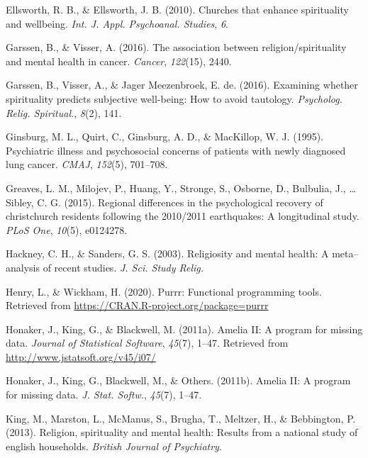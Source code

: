 \documentclass[
  english,
  man,floatsintext]{apa6}
\begin{document}
\leavevmode\hypertarget{ref-Ellsworth2010-yu}{}%
Ellsworth, R. B., \& Ellsworth, J. B. (2010). Churches that enhance spirituality and wellbeing. \emph{Int. J. Appl. Psychoanal. Studies}, \emph{6}.

\leavevmode\hypertarget{ref-Garssen2016-km}{}%
Garssen, B., \& Visser, A. (2016). The association between religion/spirituality and mental health in cancer. \emph{Cancer}, \emph{122}(15), 2440.

\leavevmode\hypertarget{ref-Garssen2016-kb}{}%
Garssen, B., Visser, A., \& Jager Meezenbroek, E. de. (2016). Examining whether spirituality predicts subjective well-being: How to avoid tautology. \emph{Psycholog. Relig. Spiritual.}, \emph{8}(2), 141.

\leavevmode\hypertarget{ref-Ginsburg1995-jr}{}%
Ginsburg, M. L., Quirt, C., Ginsburg, A. D., \& MacKillop, W. J. (1995). Psychiatric illness and psychosocial concerns of patients with newly diagnosed lung cancer. \emph{CMAJ}, \emph{152}(5), 701--708.

\leavevmode\hypertarget{ref-greaves2015regional}{}%
Greaves, L. M., Milojev, P., Huang, Y., Stronge, S., Osborne, D., Bulbulia, J., \ldots{} Sibley, C. G. (2015). Regional differences in the psychological recovery of christchurch residents following the 2010/2011 earthquakes: A longitudinal study. \emph{PLoS One}, \emph{10}(5), e0124278.

\leavevmode\hypertarget{ref-Hackney2003-rs}{}%
Hackney, C. H., \& Sanders, G. S. (2003). Religiosity and mental health: A meta--analysis of recent studies. \emph{J. Sci. Study Relig.}

\leavevmode\hypertarget{ref-R-purrr}{}%
Henry, L., \& Wickham, H. (2020). Purrr: Functional programming tools. Retrieved from \url{https://CRAN.R-project.org/package=purrr}

\leavevmode\hypertarget{ref-R-Amelia}{}%
Honaker, J., King, G., \& Blackwell, M. (2011a). Amelia II: A program for missing data. \emph{Journal of Statistical Software}, \emph{45}(7), 1--47. Retrieved from \url{http://www.jstatsoft.org/v45/i07/}

\leavevmode\hypertarget{ref-Honaker2011-yu}{}%
Honaker, J., King, G., Blackwell, M., \& Others. (2011b). Amelia II: A program for missing data. \emph{J. Stat. Softw.}, \emph{45}(7), 1--47.

\leavevmode\hypertarget{ref-King2013-cg}{}%
King, M., Marston, L., McManus, S., Brugha, T., Meltzer, H., \& Bebbington, P. (2013). Religion, spirituality and mental health: Results from a national study of english households. \emph{British Journal of Psychiatry}.
\end{document}
